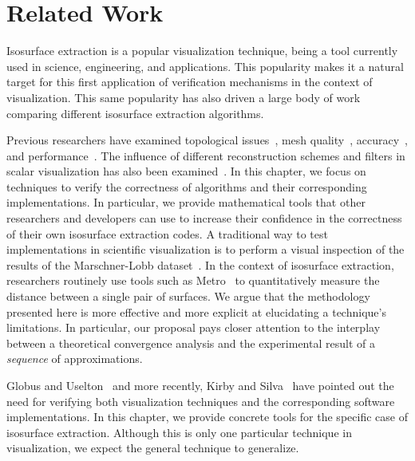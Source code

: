 \section{Related Work}
\label{chap1:sec:prevwork}

Isosurface extraction is a popular visualization technique, being a
tool currently used in science, engineering, and applications.
This popularity makes it a natural target for this first application of
verification mechanisms in the context of visualization.
%
This same popularity has also driven a large body of work
comparing different isosurface extraction algorithms.

Previous researchers have examined topological 
issues~\cite{ning93, Lewiner:2003},
mesh quality~\cite{Dietrich:TVCG:2008,Schreiner06},
accuracy~\cite{patera04,zhou01}, and
performance~\cite{Sutton00acase}. The influence of different reconstruction schemes and 
filters in scalar visualization has also been examined~\cite{Hamish06,Pommert02}.
In this chapter, we focus on techniques to verify the correctness of
algorithms and their corresponding implementations. In particular, we
provide mathematical tools that other researchers and developers can
use to increase their confidence in the correctness of their own
isosurface extraction codes.  A traditional way to test
implementations in scientific visualization is to perform a visual
inspection of the results of the Marschner-Lobb
dataset~\cite{marschnerlobb}. In the context of isosurface extraction,
researchers routinely use tools such as Metro~\cite{Cignoni:1998:MET} to
quantitatively measure the distance between a single pair of surfaces.
We argue that the methodology presented here is more effective and more
explicit at elucidating a technique's limitations. In particular, our proposal
pays closer attention to the interplay between a theoretical
convergence analysis and the experimental result of a \emph{sequence} of
approximations.

Globus and Uselton~\cite{globus95} and more recently,
Kirby and Silva~\cite{kirby-vv-08} have pointed out the need 
for verifying both visualization techniques and the corresponding
software implementations. In this chapter, we provide concrete tools for
the specific case of isosurface extraction. Although this is only one
particular technique in visualization, we expect the general technique
to generalize.


